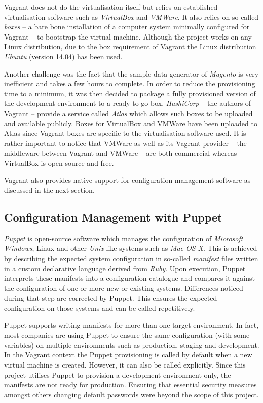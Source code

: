 Vagrant does not do the virtualisation itself but relies on established virtualisation software such as \emph{VirtualBox} and \emph{VMWare}. It also relies on so called \emph{boxes} -- a bare bone installation of a computer system minimally configured for Vagrant -- to bootstrap the virtual machine. Although the project works on any Linux distribution, due to the box requirement of Vagrant the Linux distribution \emph{Ubuntu} (version 14.04) has been used.

Another challenge was the fact that the sample data generator of \emph{Magento} is very inefficient and takes a few hours to complete. In order to reduce the provisioning time to a minimum, it was then decided to package a fully provisioned version of the development environment to a ready-to-go box. \emph{HashiCorp} -- the authors of Vagrant -- provide a service called \emph{Atlas} which allows such boxes to be uploaded and available publicly. Boxes for VirtualBox and VMWare have been uploaded to Atlas since Vagrant boxes are specific to the virtualisation software used. It is rather important to notice that VMWare as well as its Vagrant provider -- the middleware between Vagrant and VMWare -- are both commercial whereas VirtualBox is open-source and free.

Vagrant also provides native support for configuration management software as discussed in the next section.

\subsection{Configuration Management with Puppet}

\emph{Puppet} is open-source software which manages the configuration of \emph{Microsoft Windows}, Linux and other \emph{Unix}-like systems such as \emph{Mac OS X}. This is achieved by describing the expected system configuration in so-called \emph{manifest} files written in a custom declarative language derived from \emph{Ruby}. Upon execution, Puppet interprets these manifests into a configuration catalogue and compares it against the configuration of one or more new or existing systems. Differences noticed during that step are corrected by Puppet. This ensures the expected configuration on those systems and can be called repetitively.

Puppet supports writing manifests for more than one target environment. In fact, most companies are using Puppet to ensure the same configuration (with some variables) on multiple environments such as production, staging and development. In the Vagrant context the Puppet provisioning is called by default when a new virtual machine is created. However, it can also be called explicitly. Since this project utilises Puppet to provision a development environment only, the manifests are not ready for production. Ensuring that essential security measures amongst others changing default passwords were beyond the scope of this project.

